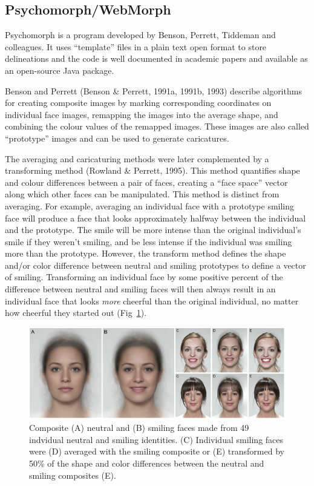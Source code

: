 \documentclass[
  man,floatsintext]{apa6}
\begin{document}
\hypertarget{psychomorph}{%
\subsection{Psychomorph/WebMorph}\label{psychomorph}}

Psychomorph is a program developed by Benson, Perrett, Tiddeman and colleagues. It uses ``template'' files in a plain text open format to store delineations and the code is well documented in academic papers and available as an open-source Java package.

Benson and Perrett (Benson \& Perrett, 1991a, 1991b, 1993) describe algorithms for creating composite images by marking corresponding coordinates on individual face images, remapping the images into the average shape, and combining the colour values of the remapped images. These images are also called ``prototype'' images and can be used to generate caricatures.

The averaging and caricaturing methods were later complemented by a transforming method (Rowland \& Perrett, 1995). This method quantifies shape and colour differences between a pair of faces, creating a ``face space'' vector along which other faces can be manipulated. This method is distinct from averaging. For example, averaging an individual face with a prototype smiling face will produce a face that looks approximately halfway between the individual and the prototype. The smile will be more intense than the original individual's smile if they weren't smiling, and be less intense if the individual was smiling more than the prototype. However, the transform method defines the shape and/or color difference between neutral and smiling prototypes to define a vector of smiling. Transforming an individual face by some positive percent of the difference between neutral and smiling faces will then always result in an individual face that looks \emph{more} cheerful than the original individual, no matter how cheerful they started out (Fig~\ref{fig:transform-demo}).



\begin{figure}
\includegraphics[width=1\linewidth]{index_files/figure-latex/transform-demo-1} \caption{Composite (A) neutral and (B) smiling faces made from 49 indvidual neutral and smiling identities. (C) Individual smiling faces were (D) averaged with the smiling composite or (E) transformed by 50\% of the shape and color differences between the neutral and smiling composites (E).}\label{fig:transform-demo}
\end{figure}
\end{document}

